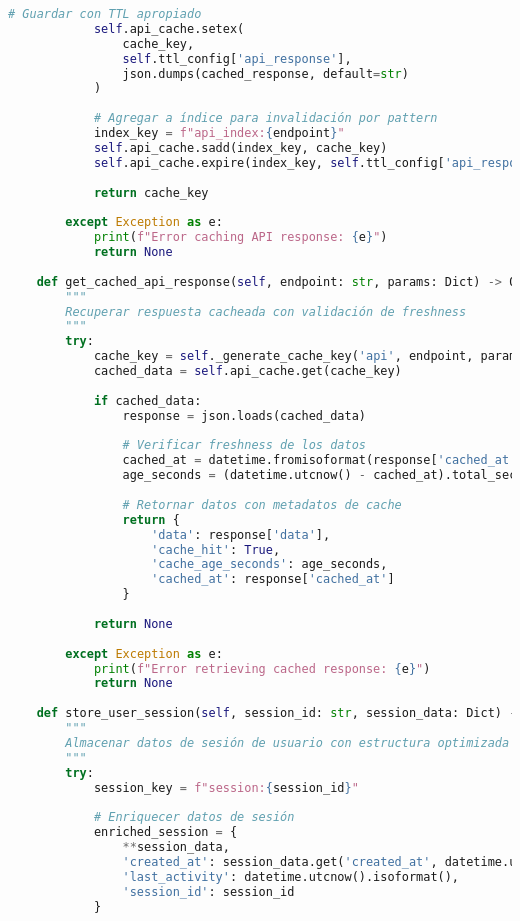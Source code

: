 \begin{lstlisting}[language=python, caption=Implementación de Patrones de Caché Avanzados, label=lst:redis_patterns]
            # Guardar con TTL apropiado
            self.api_cache.setex(
                cache_key,
                self.ttl_config['api_response'],
                json.dumps(cached_response, default=str)
            )
            
            # Agregar a índice para invalidación por pattern
            index_key = f"api_index:{endpoint}"
            self.api_cache.sadd(index_key, cache_key)
            self.api_cache.expire(index_key, self.ttl_config['api_response'] * 2)
            
            return cache_key
            
        except Exception as e:
            print(f"Error caching API response: {e}")
            return None
    
    def get_cached_api_response(self, endpoint: str, params: Dict) -> Optional[Dict]:
        """
        Recuperar respuesta cacheada con validación de freshness
        """
        try:
            cache_key = self._generate_cache_key('api', endpoint, params)
            cached_data = self.api_cache.get(cache_key)
            
            if cached_data:
                response = json.loads(cached_data)
                
                # Verificar freshness de los datos
                cached_at = datetime.fromisoformat(response['cached_at'])
                age_seconds = (datetime.utcnow() - cached_at).total_seconds()
                
                # Retornar datos con metadatos de cache
                return {
                    'data': response['data'],
                    'cache_hit': True,
                    'cache_age_seconds': age_seconds,
                    'cached_at': response['cached_at']
                }
            
            return None
            
        except Exception as e:
            print(f"Error retrieving cached response: {e}")
            return None
    
    def store_user_session(self, session_id: str, session_data: Dict) -> bool:
        """
        Almacenar datos de sesión de usuario con estructura optimizada
        """
        try:
            session_key = f"session:{session_id}"
            
            # Enriquecer datos de sesión
            enriched_session = {
                **session_data,
                'created_at': session_data.get('created_at', datetime.utcnow().isoformat()),
                'last_activity': datetime.utcnow().isoformat(),
                'session_id': session_id
            }
            

\end{lstlisting}
